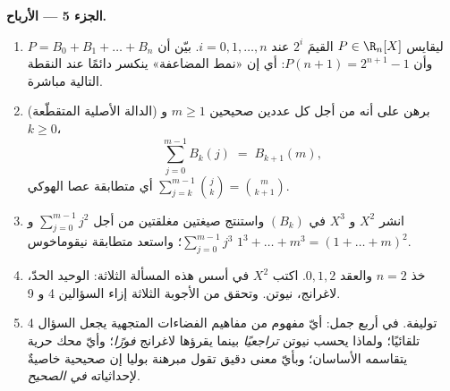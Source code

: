 \begin{problem}
\medskip
\noindent\textbf{الجزء 5 --- الأرباح.}
\begin{enumerate}[resume]
  \item ليقايس $P \in \R_n[X]$ القيمَ $2^i$ عند $i =
        0, 1, \dots, n$. بيّن أن $P = B_0 + B_1 + \dots + B_n$
        وأن $P(n + 1) = 2^{n+1} - 1$: أي إن «نمط
        المضاعفة» ينكسر دائمًا عند النقطة التالية مباشرة.
  \item (الدالة الأصلية المتقطّعة) برهن على أنه من أجل كل عددين صحيحين $m
        \geq 1$ و $k \geq 0$،
        \[
        \sum_{j=0}^{m-1} B_k(j) \;=\; B_{k+1}(m),
        \]
        أي متطابقة عصا الهوكي $\sum_{j=k}^{m-1}
        \binom{j}{k} = \binom{m}{k+1}$.
  \item انشر $X^2$ و $X^3$ في  $(B_k)$ واستنتج
        صيغتين مغلقتين من أجل $\sum_{j=0}^{m-1} j^2$ و
        $\sum_{j=0}^{m-1} j^3$؛ واستعد متطابقة نيقوماخوس
        $1^3 + \dots + m^3 = (1 + \dots + m)^2$.
  \item خذ $n = 2$ والعقد $0, 1, 2$. اكتب 
        $X^2$ في أسس هذه المسألة الثلاثة:  الوحيد الحدّ،
         لاغرانج،  نيوتن. وتحقق من
        الأجوبة الثلاثة إزاء السؤالين 4 و 9.
  \item توليفة. في أربع جمل: أيّ مفهوم من مفاهيم الفضاءات المتجهية
        يجعل السؤال 4 تلقائيًا؛ ولماذا يحسب  نيوتن
         \emph{تراجعيًا} بينما يقرؤها  لاغرانج
        \emph{فورًا}؛ وأيّ محك حرية يتقاسمه
        الأساسان؛ وبأيّ معنى دقيق تقول مبرهنة بوليا إن
        صحيحية  خاصيةٌ لإحداثياته
        \emph{في  الصحيح}.
\end{enumerate}
\end{problem}
